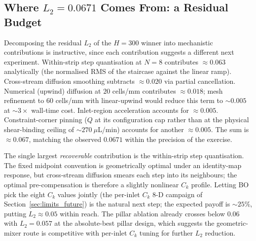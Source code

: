 \documentclass[12pt]{article}
\begin{document}
\subsection{Where $L_2 = 0.0671$ Comes From: a Residual Budget}
\label{sec:residual_budget}
Decomposing the residual $L_2$ of the $H = 300$ winner into mechanistic contributions is instructive, since each contribution suggests a different next experiment. Within-strip step quantisation at $N = 8$ contributes $\approx 0.063$ analytically (the normalised RMS of the staircase against the linear ramp). Cross-stream diffusion smoothing subtracts $\approx 0.020$ via partial cancellation. Numerical (upwind) diffusion at $20$ cells/mm contributes $\approx 0.018$; mesh refinement to $60$ cells/mm with linear-upwind would reduce this term to $\sim 0.005$ at $\sim 3 \times$ wall-time cost. Inlet-region acceleration accounts for $\approx 0.005$. Constraint-corner pinning ($Q$ at its configuration cap rather than at the physical shear-binding ceiling of $\sim 270~\mu$L/min) accounts for another $\approx 0.005$. The sum is $\approx 0.067$, matching the observed $0.0671$ within the precision of the exercise.

The single largest \emph{recoverable} contribution is the within-strip step quantisation. The fixed midpoint convention is geometrically optimal under an identity-map response, but cross-stream diffusion smears each step into its neighbours; the optimal pre-compensation is therefore a slightly nonlinear $C_k$ profile. Letting BO pick the eight $C_k$ values jointly (the per-inlet $C_k$ 8-D campaign of Section~\ref{sec:limits_future}) is the natural next step; the expected payoff is $\sim 25\%$, putting $L_2 \approx 0.05$ within reach. The pillar ablation already crosses below $0.06$ with $L_2 = 0.057$ at the absolute-best pillar design, which suggests the geometric-mixer route is competitive with per-inlet $C_k$ tuning for further $L_2$ reduction.
\end{document}
